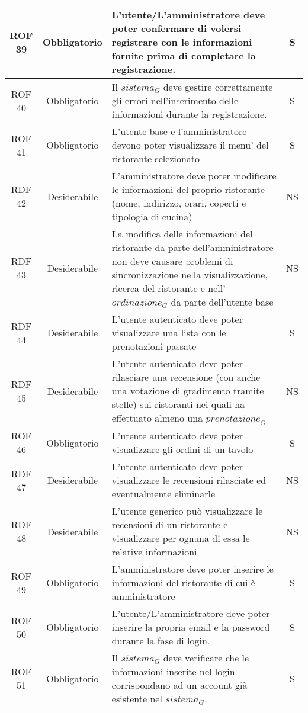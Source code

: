 \begin{longtable}{|c|c|p{12cm}|c|}
\hline
ROF 39& Obbligatorio & L'utente/L'amministratore deve poter confermare di volersi registrare con le informazioni fornite prima di completare la registrazione. & S\\
\hline
ROF 40& Obbligatorio & Il $\textit{sistema}_G$ deve gestire correttamente gli errori nell'inserimento delle informazioni durante la registrazione. & S\\
\hline 
ROF 41& Obbligatorio & L'utente base e l'amministratore devono poter visualizzare il menu' del ristorante selezionato & S\\
\hline
RDF 42& Desiderabile & L'amministratore deve poter modificare le informazioni del proprio ristorante (nome, indirizzo, orari, coperti e tipologia di cucina) & NS\\
\hline
RDF 43& Desiderabile & La modifica delle informazioni del ristorante da parte dell'amministratore non deve causare problemi di sincronizzazione nella visualizzazione, ricerca del ristorante e nell'$\textit{ordinazione}_G$ da parte dell'utente base & NS\\
\hline
RDF 44& Desiderabile & L'utente autenticato deve poter visualizzare una lista con le prenotazioni passate & S\\
\hline
RDF 45& Desiderabile & L'utente autenticato deve poter rilasciare una recensione (con anche una votazione di gradimento tramite stelle) sui ristoranti nei quali ha effettuato almeno una $\textit{prenotazione}_G$ & NS\\
\hline
ROF 46& Obbligatorio & L'utente autenticato deve poter visualizzare gli ordini di un tavolo & S\\
\hline
RDF 47& Desiderabile & L'utente autenticato deve poter visualizzare le recensioni rilasciate ed eventualmente eliminarle & NS\\
\hline
RDF 48& Desiderabile & L'utente generico può visualizzare le recensioni di un ristorante e visualizzare per ognuna di essa le relative informazioni & NS\\
\hline
ROF 49& Obbligatorio & L'amministratore deve poter inserire le informazioni del ristorante di cui è amministratore & S\\
\hline
ROF 50& Obbligatorio & L'utente/L'amministratore deve poter inserire la propria email e la password durante la fase di login.  & S\\
\hline
ROF 51& Obbligatorio & Il $\textit{sistema}_G$ deve verificare che le informazioni inserite nel login corrispondano ad un account già esistente nel $\textit{sistema}_G$.  & S\\

\end{longtable}
